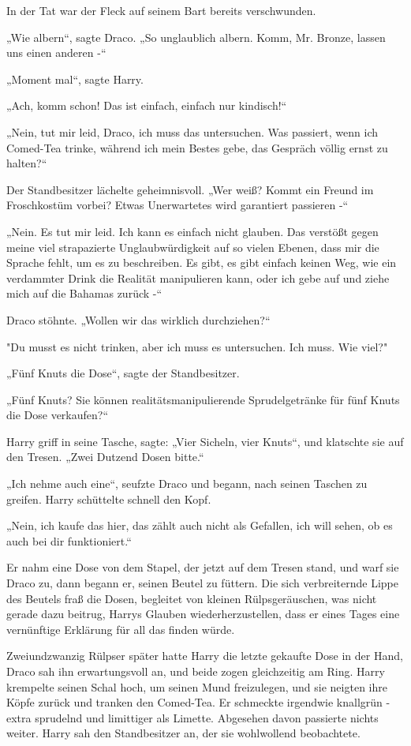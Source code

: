 {In der Tat war der Fleck auf seinem Bart bereits verschwunden.

„Wie albern“, sagte Draco. „So unglaublich albern. Komm, Mr. Bronze, lassen uns einen anderen -“

„Moment mal“, sagte Harry.

„Ach, komm schon! Das ist einfach, einfach nur kindisch!“

„Nein, tut mir leid, Draco, ich muss das untersuchen. Was passiert, wenn ich Comed-Tea trinke, während ich mein Bestes gebe, das Gespräch völlig ernst zu halten?“

Der Standbesitzer lächelte geheimnisvoll. „Wer weiß? Kommt ein Freund im Froschkostüm vorbei? Etwas Unerwartetes wird garantiert passieren -“

„Nein. Es tut mir leid. Ich kann es einfach nicht glauben. Das verstößt gegen meine viel strapazierte Unglaubwürdigkeit auf so vielen Ebenen, dass mir die Sprache fehlt, um es zu beschreiben. Es gibt, es gibt einfach keinen Weg, wie ein verdammter Drink die Realität manipulieren kann, oder ich gebe auf und ziehe mich auf die Bahamas zurück -“

Draco stöhnte. „Wollen wir das wirklich durchziehen?“

"Du musst es nicht trinken, aber ich muss es untersuchen. Ich muss. Wie viel?"

„Fünf Knuts die Dose“, sagte der Standbesitzer.

„Fünf Knuts? Sie können realitätsmanipulierende Sprudelgetränke für fünf Knuts die Dose verkaufen?“

Harry griff in seine Tasche, sagte: „Vier Sicheln, vier Knuts“, und klatschte sie auf den Tresen. „Zwei Dutzend Dosen bitte.“

„Ich nehme auch eine“, seufzte Draco und begann, nach seinen Taschen zu greifen. Harry schüttelte schnell den Kopf.

„Nein, ich kaufe das hier, das zählt auch nicht als Gefallen, ich will sehen, ob es auch bei dir funktioniert.“

Er nahm eine Dose von dem Stapel, der jetzt auf dem Tresen stand, und warf sie Draco zu, dann begann er, seinen Beutel zu füttern. Die sich verbreiternde Lippe des Beutels fraß die Dosen, begleitet von kleinen Rülpsgeräuschen, was nicht gerade dazu beitrug, Harrys Glauben wiederherzustellen, dass er eines Tages eine vernünftige Erklärung für all das finden würde.

Zweiundzwanzig Rülpser später hatte Harry die letzte gekaufte Dose in der Hand, Draco sah ihn erwartungsvoll an, und beide zogen gleichzeitig am Ring. Harry krempelte seinen Schal hoch, um seinen Mund freizulegen, und sie neigten ihre Köpfe zurück und tranken den Comed-Tea. Er schmeckte irgendwie knallgrün - extra sprudelnd und limittiger als Limette. Abgesehen davon passierte nichts weiter. Harry sah den Standbesitzer an, der sie wohlwollend beobachtete.

}
